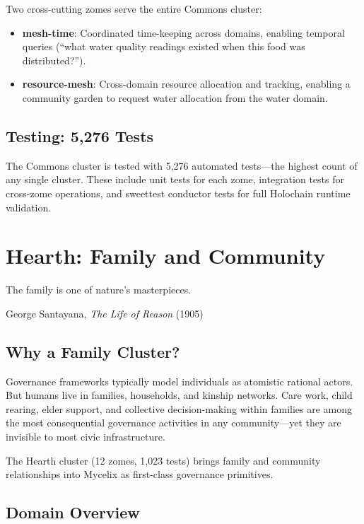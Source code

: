 \documentclass[12pt]{book}
\begin{document}
Two cross-cutting zomes serve the entire Commons cluster:

\begin{itemize}
  \item \textbf{mesh-time}: Coordinated time-keeping across domains, enabling
    temporal queries (``what water quality readings existed when this food was
    distributed?'').
  \item \textbf{resource-mesh}: Cross-domain resource allocation and tracking,
    enabling a community garden to request water allocation from the water
    domain.
\end{itemize}

\section{Testing: 5,276 Tests}

The Commons cluster is tested with 5,276 automated tests---the highest count
of any single cluster. These include unit tests for each zome, integration
tests for cross-zome operations, and sweettest conductor tests for full
Holochain runtime validation.


\chapter{Hearth: Family and Community}

\epigraph{The family is one of nature's masterpieces.}{George Santayana,
\textit{The Life of Reason} (1905)}

\section{Why a Family Cluster?}

Governance frameworks typically model individuals as atomistic rational actors.
But humans live in families, households, and kinship networks. Care work, child
rearing, elder support, and collective decision-making within families are among
the most consequential governance activities in any community---yet they are
invisible to most civic infrastructure.

The Hearth cluster (12 zomes, 1,023 tests) brings family and community
relationships into Mycelix as first-class governance primitives.

\section{Domain Overview}
\end{document}
